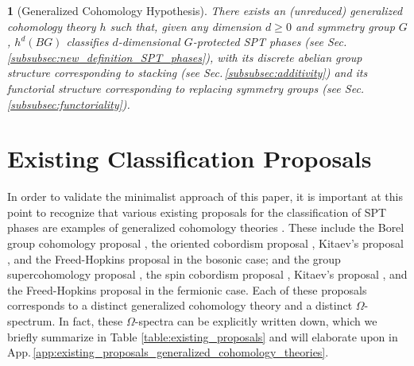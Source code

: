\documentclass[sort&compress]{elsarticle}
\theoremstyle{theoremstyle}
\theoremstyle{framedtheoremstyle}
\theoremstyle{definitionstyle}
\theoremstyle{definitionstyle}
\theoremstyle{definitionstyle}
\theoremstyle{definitionstyle}
\theoremstyle{nameddefinitionstyle}
\theoremstyle{framednameddefinitionstyle}
\newtheorem*{framednameddef}{}
\theoremstyle{proofstyle}
\theoremstyle{definitionstyle}
\begin{document}
\begin{framed}
\begin{framednameddef}[Generalized Cohomology Hypothesis]
There exists an (unreduced) generalized cohomology theory $h$ such that, given any dimension $d\geq 0$ and symmetry group $G$, $h^d(BG)$ classifies $d$-dimensional $G$-protected SPT phases (see Sec.\,\ref{subsubsec:new_definition_SPT_phases}), with its discrete abelian group structure corresponding to stacking (see Sec.\,\ref{subsubsec:additivity}) and its functorial structure corresponding to replacing symmetry groups (see Sec.\,\ref{subsubsec:functoriality}).
\end{framednameddef}
\end{framed}









\section{Existing Classification Proposals\label{sec:comparison_different_proposals}}

In order to validate the minimalist approach of this paper, it is important at this point to recognize that various existing proposals for the classification of SPT phases are examples of generalized cohomology theories \cite{Kitaev_Stony_Brook_2011_SRE_1, Kitaev_Stony_Brook_2013_SRE, Kitaev_IPAM}. These include the Borel group cohomology proposal \cite{Wen_Boson}, the oriented cobordism proposal \cite{Kapustin_Boson}, Kitaev's proposal \cite{Kitaev_Stony_Brook_2011_SRE_1, Kitaev_Stony_Brook_2013_SRE}, and the Freed-Hopkins proposal \cite{Freed_SRE_iTQFT, Freed_ReflectionPositivity} in the bosonic case; and the group supercohomology proposal \cite{Wen_Fermion}, the spin cobordism proposal \cite{Kapustin_Fermion}, Kitaev's proposal \cite{Kitaev_Stony_Brook_2013_SRE, Kitaev_IPAM}, and the Freed-Hopkins proposal \cite{Freed_SRE_iTQFT, Freed_ReflectionPositivity} in the fermionic case. Each of these proposals corresponds to a distinct generalized cohomology theory and a distinct $\Omega$-spectrum. In fact, these $\Omega$-spectra can be explicitly written down, which we briefly summarize in Table \ref{table:existing_proposals} and will elaborate upon in App.\,\ref{app:existing_proposals_generalized_cohomology_theories}.
\end{document}
